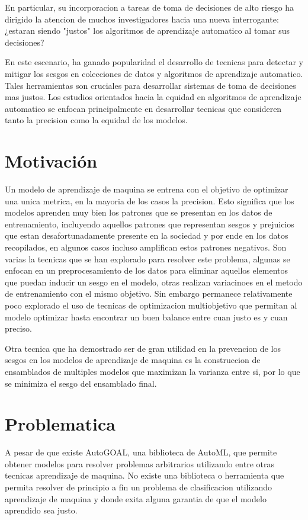 En particular, su incorporacion a tareas de toma de decisiones de alto riesgo ha dirigido la atencion de muchos investigadores hacia una nueva interrogante: ¿estaran siendo "justos" los algoritmos de aprendizaje automatico al tomar sus decisiones?

En este escenario, ha ganado popularidad el desarrollo de tecnicas para detectar y mitigar los sesgos en colecciones de datos y algoritmos de aprendizaje automatico. Tales herramientas son cruciales para desarrollar sistemas de toma de decisiones mas justos. Los estudios orientados hacia la equidad en algoritmos de aprendizaje automatico se enfocan principalmente en desarrollar tecnicas que consideren tanto la precision como la equidad de los modelos.

\section*{Motivación}

Un modelo de aprendizaje de maquina se entrena con el objetivo de optimizar una unica metrica, en la mayoria de los casos la precision. Esto significa que los modelos aprenden muy bien los patrones que se presentan en los datos de entrenamiento, incluyendo aquellos patrones que representan sesgos y prejuicios que estan desafortunadamente presente en la sociedad y por ende en los datos recopilados, en algunos casos incluso amplifican estos patrones negativos. Son varias la tecnicas que se han explorado para resolver este problema, algunas se enfocan en un preprocesamiento de los datos para eliminar aquellos elementos que puedan inducir un sesgo en el modelo, otras realizan variacinoes en el metodo de entrenamiento con el mismo objetivo. Sin embargo permanece relativamente poco explorado el uso de tecnicas de optimizacion multiobjetivo que permitan al modelo optimizar hasta encontrar un buen balance entre cuan justo es y cuan preciso.

Otra tecnica que ha demostrado ser de gran utilidad en la prevencion de los sesgos en los modelos de aprendizaje de maquina es la construccion de ensamblados de multiples modelos que maximizan la varianza entre si, por lo que se minimiza el sesgo del ensamblado final.

\section*{Problematica}

A pesar de que existe AutoGOAL, una biblioteca de AutoML, que permite obtener modelos para resolver problemas arbitrarios utilizando entre otras tecnicas aprendizaje de maquina. No existe una biblioteca o herramienta que permita resolver de principio a fin un problema de clasificacion utilizando aprendizaje de maquina y donde exita alguna garantia de que el modelo aprendido sea justo.

